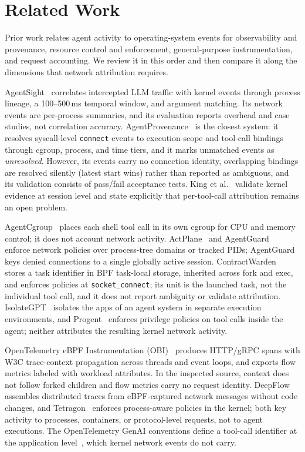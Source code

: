 \section{Related Work}
\label{sec:related}
Prior work relates agent activity to operating-system events for observability and provenance, resource control and enforcement, general-purpose instrumentation, and request accounting. We review it in this order and then compare it along the dimensions that network attribution requires.

AgentSight~\cite{zheng2025agentsight} correlates intercepted LLM traffic with kernel events through process lineage, a 100--500\,ms temporal window, and argument matching. Its network events are per-process summaries, and its evaluation reports overhead and case studies, not correlation accuracy. AgentProvenance~\cite{byteyellow2026agentprovenance} is the closest system: it resolves syscall-level \texttt{connect} events to execution-scope and tool-call bindings through cgroup, process, and time tiers, and it marks unmatched events as \emph{unresolved}. However, its events carry no connection identity, overlapping bindings are resolved silently (latest start wins) rather than reported as ambiguous, and its validation consists of pass/fail acceptance tests. King et al.~\cite{king2026kernelevidence} validate kernel evidence at session level and state explicitly that per-tool-call attribution remains an open problem.

AgentCgroup~\cite{zheng2026agentcgroup} places each shell tool call in its own cgroup for CPU and memory control; it does not account network activity. ActPlane~\cite{zheng2026actplane} and AgentGuard~\cite{shukla2026agentguard} enforce network policies over process-tree domains or tracked PIDs; AgentGuard keys denied connections to a single globally active session. ContractWarden~\cite{cui2026contractwarden} stores a task identifier in BPF task-local storage, inherited across fork and exec, and enforces policies at \texttt{socket\_connect}; its unit is the launched task, not the individual tool call, and it does not report ambiguity or validate attribution. IsolateGPT~\cite{wu2025isolategpt} isolates the apps of an agent system in separate execution environments, and Progent~\cite{shi2025progent} enforces privilege policies on tool calls inside the agent; neither attributes the resulting kernel network activity.

OpenTelemetry eBPF Instrumentation (OBI)~\cite{otel2026obi} produces HTTP/gRPC spans with W3C trace-context propagation across threads and event loops, and exports flow metrics labeled with workload attributes. In the inspected source, context does not follow forked children and flow metrics carry no request identity. DeepFlow~\cite{shen2023deepflow} assembles distributed traces from eBPF-captured network messages without code changes, and Tetragon~\cite{tetragon} enforces process-aware policies in the kernel; both key activity to processes, containers, or protocol-level requests, not to agent executions. The OpenTelemetry GenAI conventions define a tool-call identifier at the application level~\cite{otel2026genai}, which kernel network events do not carry.

